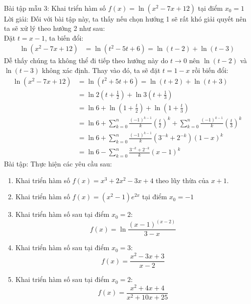\\Bài tập mẫu 3: Khai triển hàm số $f(x)=\ln{(x^2-7x+12)}$ tại điểm $x_{0}=1$
\\Lời giải: Đối với bài tập này, ta thấy nếu chọn hướng 1 sẽ rất khó giải quyết nên ta sẽ xử lý theo hướng 2 như sau:\\
Đặt $t=x-1$, ta biến đổi:
\begin{equation*}
\begin{split}
\ln{(x^2-7x+12)}&=\ln{(t^2-5t+6)}=\ln{(t-2)}+\ln{(t-3)}
\end{split}
\end{equation*}
Dễ thấy chúng ta không thể đi tiếp theo hướng này do $t\rightarrow0$ nên $\ln{(t-2)}$ và $\ln{(t-3)}$ không xác định. Thay vào đó, ta sẽ đặt $t=1-x$ rồi biến đổi:
\begin{equation*}
\begin{split}
\ln{(x^2-7x+12)}&=\ln{(t^2+5t+6)}=\ln{(t+2)}+\ln{(t+3)}\\&=\ln{2\left(t+\frac{1}{2}\right)}+\ln{3\left(t+\frac{1}{3}\right)}\\&=\ln{6}+\ln{\left(1+\frac{t}{2}\right)}+\ln{\left(1+\frac{t}{3}\right)}\\&=\ln{6}+\sum_{k=0}^{n}\frac{(-1)^{k-1}}{k}\left(\frac{t}{2}\right)^{k}+\sum_{k=0}^{n}\frac{(-1)^{k-1}}{k}\left(\frac{t}{3}\right)^k
\\&=\ln{6}+\sum_{k=0}^{n}\frac{(-1)^{k-1}}{k}(3^{-k}+2^{-k})(1-x)^k\\&=\ln{6}-\sum_{k=0}^{n}\frac{3^{-k}+2^{-k}}{k}(x-1)^{k}
\end{split}
\end{equation*}
\newpage
Bài tập: Thực hiện các yêu cầu sau:
\begin{enumerate}
    \item Khai triển hàm số $f(x)=x^3+2x^2-3x+4$ theo lũy thừa của $x+1$.
    \item Khai triển hàm số $f(x)=(x^2-1)e^{2x}$ tại điểm $x_{0}=-1$
    \item Khai triển hàm số sau tại điểm $x_{0}=2$: $$f(x)=\ln{\frac{(x-1)^{(x-2)}}{3-x}}$$
    \item Khai triển hàm số sau tại điểm $x_{0}=3$: $$f(x)=\frac{x^2-3x+3}{x-2}$$
    \item Khai triển hàm số sau tại điểm $x_{0}=2$: $$f(x)=\frac{x^2+4x+4}{x^2+10x+25}$$
\end{enumerate}
